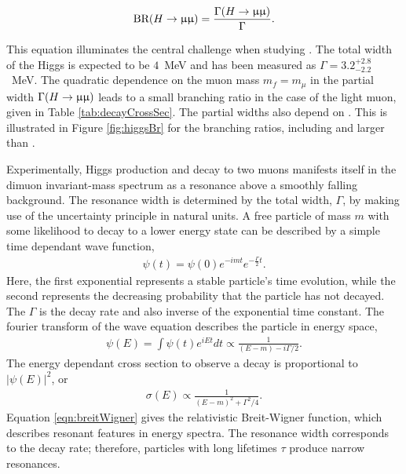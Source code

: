 \begin{equation}\begin{split}
    \text{BR}(H\to\upmu\upmu)=\frac{\Gamma(H\to\upmu\upmu)}{\Gamma}.
\end{split}\end{equation} 

This equation illuminates the central challenge when studying \hmm. 
The total width of the Higgs is expected to be $4$~MeV and has been measured as $\Gamma=3.2^{+2.8}_{-2.2}$~MeV. \cite{cmsWidth}
The quadratic dependence on the muon mass $m_f=m_\mu$ in the partial width $\Gamma(H\to\upmu\upmu)$ leads to a small branching ratio in the case of the light muon, given in Table \ref{tab:decayCrossSec}.
The partial widths also depend on \mh. This is illustrated in Figure \ref{fig:higgsBr} for the branching ratios, including and larger than \hmm.

Experimentally, Higgs production and decay to two muons manifests itself in the dimuon invariant-mass spectrum as a resonance above a smoothly falling background.
The resonance width is determined by the total width, $ \Gamma $, by making use of the uncertainty principle in natural units.
A free particle of mass $m$ with some likelihood to decay to a lower energy state can be described by a simple time dependant wave function,
\begin{equation}\begin{split}
    \psi(t)=\psi(0)e^{-imt}e^{-\frac{\Gamma}{2}t}.
\end{split}\end{equation} 
Here, the first exponential represents a stable particle's time evolution, while the second represents the decreasing probability that the particle has not decayed.
The $\Gamma$ is the decay rate and also inverse of the exponential time constant.
The fourier transform of the wave equation describes the particle in energy space,
\begin{equation}\begin{split}
    \psi(E)=\int\psi(t)e^{iEt}dt\propto \frac{1}{(E-m)-i\Gamma/2}.
\end{split}\end{equation}
The energy dependant cross section to observe a decay is proportional to $|\psi(E)|^2$, or 
\begin{equation}\begin{split}\label{eqn:breitWigner}
    \sigma(E)\propto\frac{1}{(E-m)^2+\Gamma^2/4}.
\end{split}\end{equation} 
Equation \ref{eqn:breitWigner} gives the relativistic Breit-Wigner function, which describes resonant features in energy spectra.
The resonance width corresponds to the decay rate; therefore, particles with long lifetimes $\tau$ produce narrow resonances.

